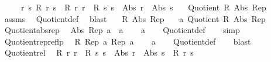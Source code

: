 \begin{isabellebody}
\ \ \ \ \ {\isachardoublequoteopen}{\isasymAnd}r\ s{\isachardot}{\kern0pt}\ R\ r\ s\ {\isasymlongleftrightarrow}\ R\ r\ r\ {\isasymand}\ R\ s\ s\ {\isasymand}\ Abs\ r\ {\isacharequal}{\kern0pt}\ Abs\ s{\isachardoublequoteclose}\isanewline
\ \ \ {\isachardoublequoteopen}Quotient{}\ R\ Abs\ Rep{\isachardoublequoteclose}\isanewline
%
\isadelimproof
\ \ %
\endisadelimproof
%
\isatagproof
{}\isamarkupfalse%
\ assms\ \isamarkupfalse%
\ Quotient{}{\isacharunderscore}{\kern0pt}def\ \isamarkupfalse%
\ blast%
\endisatagproof
{\isafoldproof}%
%
\isadelimproof
\isanewline
%
\endisadelimproof
\isanewline
{}\isamarkupfalse%
\isanewline
\ \ \ R\ Abs\ Rep\isanewline
\ \ \ a{\isacharcolon}{\kern0pt}\ {\isachardoublequoteopen}Quotient{}\ R\ Abs\ Rep{\isachardoublequoteclose}\isanewline
{}\isanewline
\isanewline
{}\isamarkupfalse%
\ Quotient{}{\isacharunderscore}{\kern0pt}abs{\isacharunderscore}{\kern0pt}rep{\isacharcolon}{\kern0pt}\isanewline
\ \ {\isachardoublequoteopen}Abs\ {\isacharparenleft}{\kern0pt}Rep\ a{\isacharparenright}{\kern0pt}\ {\isacharequal}{\kern0pt}\ a{\isachardoublequoteclose}\isanewline
%
\isadelimproof
\ \ %
\endisadelimproof
%
\isatagproof
{}\isamarkupfalse%
\ a\isanewline
\ \ \isamarkupfalse%
\ Quotient{}{\isacharunderscore}{\kern0pt}def\isanewline
\ \ \isamarkupfalse%
\ simp%
\endisatagproof
{\isafoldproof}%
%
\isadelimproof
\isanewline
%
\endisadelimproof
\isanewline
{}\isamarkupfalse%
\ Quotient{}{\isacharunderscore}{\kern0pt}rep{\isacharunderscore}{\kern0pt}reflp{\isacharcolon}{\kern0pt}\isanewline
\ \ {\isachardoublequoteopen}R\ {\isacharparenleft}{\kern0pt}Rep\ a{\isacharparenright}{\kern0pt}\ {\isacharparenleft}{\kern0pt}Rep\ a{\isacharparenright}{\kern0pt}{\isachardoublequoteclose}\isanewline
%
\isadelimproof
\ \ %
\endisadelimproof
%
\isatagproof
{}\isamarkupfalse%
\ a\isanewline
\ \ \isamarkupfalse%
\ Quotient{}{\isacharunderscore}{\kern0pt}def\isanewline
\ \ \isamarkupfalse%
\ blast%
\endisatagproof
{\isafoldproof}%
%
\isadelimproof
\isanewline
%
\endisadelimproof
\isanewline
{}\isamarkupfalse%
\ Quotient{}{\isacharunderscore}{\kern0pt}rel{\isacharcolon}{\kern0pt}\isanewline
\ \ {\isachardoublequoteopen}R\ r\ r\ {\isasymand}\ R\ s\ s\ {\isasymand}\ Abs\ r\ {\isacharequal}{\kern0pt}\ Abs\ s\ {\isasymlongleftrightarrow}\ R\ r\ s{\isachardoublequoteclose}\ %

\end{isabellebody}

